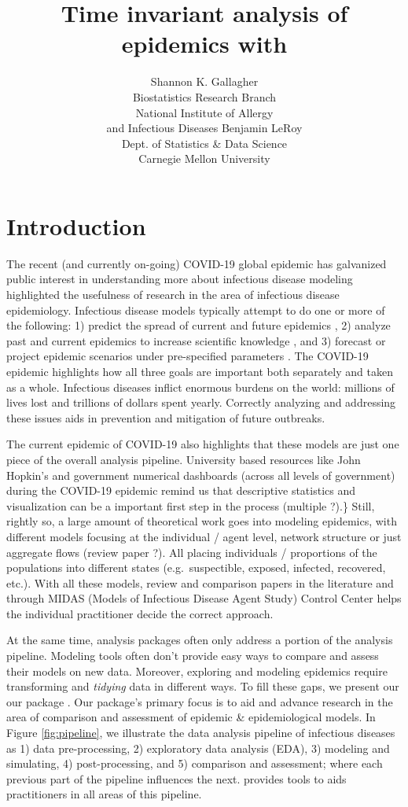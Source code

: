 \documentclass[
  shortnames]{jss}
\author{
Shannon K. Gallagher\\Biostatistics Research Branch\\
National Institute of Allergy\\
and Infectious Diseases \And Benjamin LeRoy\\Dept. of Statistics \& Data Science\\
Carnegie Mellon University
}
\title{Time invariant analysis of epidemics with \pkg{EpiCompare}}
\begin{document}
\section[Intro]{Introduction}\label{sec:intro}

The recent (and currently on-going) COVID-19 global epidemic has
galvanized public interest in understanding more about infectious
disease modeling highlighted the usefulness of research in the area of
infectious disease epidemiology. Infectious disease models typically
attempt to do one or more of the following: 1) predict the spread of
current and future epidemics
\citep[e.g. flue prediction][]{Biggerstaff2016}, 2) analyze past and
current epidemics to increase scientific knowledge
\citep[e.g. historical measle outbreaks][]{Neal2004}, and 3) forecast or
project epidemic scenarios under pre-specified parameters
\citep[e.g. ...][]{}. The COVID-19 epidemic highlights how all three
goals are important both separately and taken as a whole. Infectious
diseases inflict enormous burdens on the world: millions of lives lost
and trillions of dollars spent yearly. Correctly analyzing and
addressing these issues aids in prevention and mitigation of future
outbreaks.

The current epidemic of COVID-19 also highlights that these models are
just one piece of the overall analysis pipeline. University based
resources like John Hopkin's and government numerical dashboards (across
all levels of government) during the COVID-19 epidemic remind us that
descriptive statistics and visualization can be a important first step
in the process (multiple \cite{}?).\} Still, rightly so, a large amount
of theoretical work goes into modeling epidemics, with different models
focusing at the individual / agent level, network structure or just
aggregate flows (review paper \cite{}?). All placing individuals /
proportions of the populations into different states (e.g.~suspectible,
exposed, infected, recovered, etc.). With all these models, review and
comparison papers in the literature and through MIDAS (Models of
Infectious Disease Agent Study) Control Center helps the individual
practitioner decide the correct approach.

At the same time, analysis packages often only address a portion of the
analysis pipeline. Modeling tools often don't provide easy ways to
compare and assess their models on new data. Moreover, exploring and
modeling epidemics require transforming and \textit{tidying} data in
different ways. To fill these gaps, we present our our 
package . Our package's primary focus is to aid and
advance research in the area of comparison and assessment of epidemic \&
epidemiological models. In Figure \ref{fig:pipeline}, we illustrate the
data analysis pipeline of infectious diseases as 1) data pre-processing,
2) exploratory data analysis (EDA), 3) modeling and simulating, 4)
post-processing, and 5) comparison and assessment; where each previous
part of the pipeline influences the next.  provides
tools to aids practitioners in all areas of this pipeline.
\end{document}

